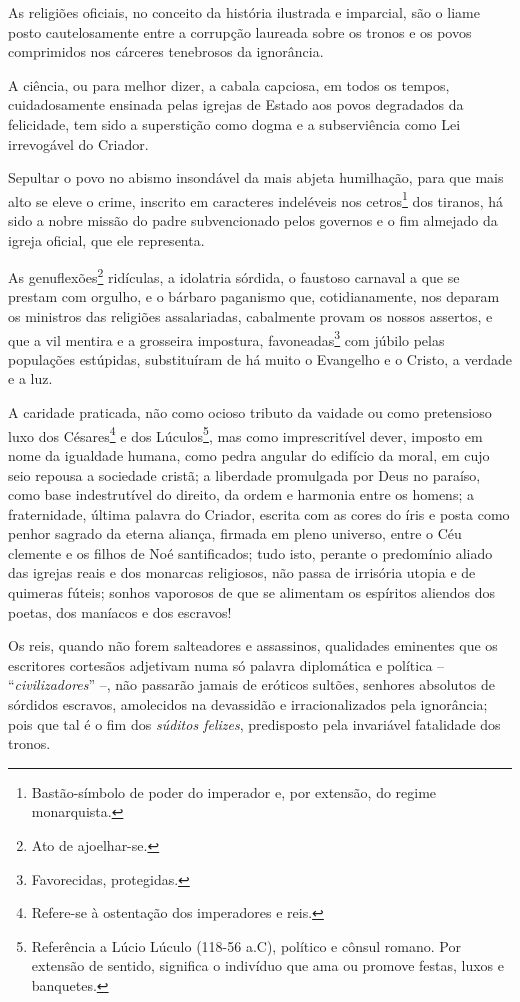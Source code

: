 As religiões oficiais, no conceito da história ilustrada e imparcial,
são o liame posto cautelosamente entre a corrupção laureada sobre os
tronos e os povos comprimidos nos cárceres tenebrosos da ignorância.

A ciência, ou para melhor dizer, a cabala capciosa, em todos os tempos,
cuidadosamente ensinada pelas igrejas de Estado aos povos degradados da
felicidade, tem sido a superstição como dogma e a subserviência como Lei
irrevogável do Criador.

Sepultar o povo no abismo insondável da mais abjeta humilhação, para que
mais alto se eleve o crime, inscrito em caracteres indeléveis nos
cetros\footnote{Bastão-símbolo de poder do imperador e, por extensão,
  do regime monarquista.} dos tiranos, há sido a nobre missão do padre
subvencionado pelos governos e o fim almejado da igreja oficial, que ele
representa.

As genuflexões\footnote{Ato de ajoelhar-se.} ridículas, a idolatria
sórdida, o faustoso carnaval a que se prestam com orgulho, e o bárbaro
paganismo que, cotidianamente, nos deparam os ministros das religiões
assalariadas, cabalmente provam os nossos assertos, e que a vil mentira
e a grosseira impostura, favoneadas\footnote{Favorecidas, protegidas.}
com júbilo pelas populações estúpidas, substituíram de há muito o
Evangelho e o Cristo, a verdade e a luz.

A caridade praticada, não como ocioso tributo da vaidade ou como
pretensioso luxo dos Césares\footnote{Refere-se à ostentação dos
  imperadores e reis.} e dos Lúculos\footnote{Referência a Lúcio
  Lúculo (118-56 a.C), político e cônsul romano. Por extensão de
  sentido, significa o indivíduo que ama ou promove festas, luxos e
  banquetes.}, mas como imprescritível dever, imposto em nome da
igualdade humana, como pedra angular do edifício da moral, em cujo seio
repousa a sociedade cristã; a liberdade promulgada por Deus no paraíso,
como base indestrutível do direito, da ordem e harmonia entre os homens;
a fraternidade, última palavra do Criador, escrita com as cores do íris
e posta como penhor sagrado da eterna aliança, firmada em pleno
universo, entre o Céu clemente e os filhos de Noé santificados; tudo
isto, perante o predomínio aliado das igrejas reais e dos monarcas
religiosos, não passa de irrisória utopia e de quimeras fúteis; sonhos
vaporosos de que se alimentam os espíritos aliendos dos poetas, dos
maníacos e dos escravos!

Os reis, quando não forem salteadores e assassinos, qualidades eminentes
que os escritores cortesãos adjetivam numa só palavra diplomática e
política -- ``\emph{civilizadores}'' --, não passarão jamais de eróticos
sultões, senhores absolutos de sórdidos escravos, amolecidos na
devassidão e irracionalizados pela ignorância; pois que tal é o fim dos
\emph{súditos felizes}, predisposto pela invariável fatalidade dos
tronos.

